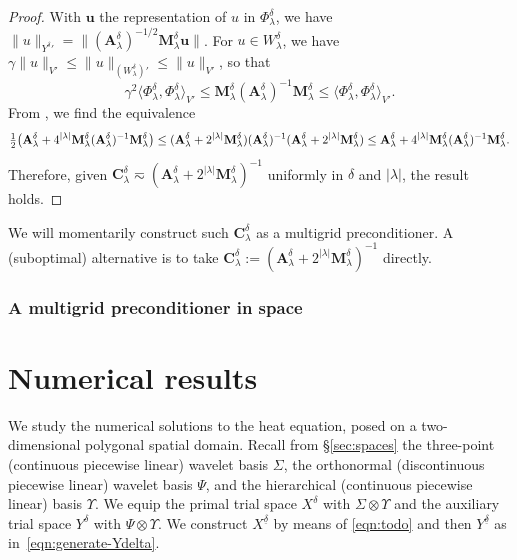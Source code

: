 \documentclass[11pt,a4paper,oneside,english]{amsart}
\numberwithin{equation}{section}
\numberwithin{theorem}{section}
\theoremstyle{definition}
\newcommand{\la}{\langle}
\newcommand{\ra}{\rangle}
\newcommand{\udelta}{{\underline{\delta}}}
\newcommand{\jw}[1]{{\color{red}{JW: #1}}}
\begin{document}
\begin{proof}

  With $\mathbf u$ the representation of $u$ in $\Phi_\lambda^\delta$, we have
  $\|u\|_{{Y^\delta}'} = \|(\mathbf A_\lambda^\delta)^{-1/2} \mathbf M_\lambda^\delta \mathbf u\|$.
For $u \in W_\lambda^\delta$, we have $\gamma \|u\|_{V'} \leq \|u\|_{(W_\lambda^\delta)'} \leq \|u\|_{V'}$, so that
  \[
    \gamma^2 \la \Phi_\lambda^\delta, \Phi_\lambda^\delta \ra_{V'} \leq \mathbf M_\lambda^\delta (\mathbf A_\lambda^\delta)^{-1} \mathbf M_\lambda^\delta \leq \la \Phi_\lambda^\delta, \Phi_\lambda^\delta \ra_{V'}.
  \]
  From \cite[Thm.~4]{Pearson2012}, we find the equivalence
  \[
\tfrac12\big( {\bf A}_\lambda^\delta + 4^{|\lambda|} {\bf M}^\delta_\lambda ({\bf A}^\delta_\lambda)^{-1}  {\bf M}^\delta_\lambda\big)
\leq ({\bf A}_\lambda^\delta + 2^{|\lambda|}{\bf M}^\delta_\lambda) ({\bf A}_\lambda^\delta)^{-1} ({\bf A}_\lambda^\delta + 2^{|\lambda|}{\bf M}^\delta_\lambda)
\leq {\bf A}_\lambda^\delta + 4^{|\lambda|} {\bf M}^\delta_\lambda ({\bf A}^\delta_\lambda)^{-1}  {\bf M}^\delta_\lambda.
\]
Therefore, given $\mathbf C_\lambda^\delta \eqsim (\mathbf A_\lambda^\delta + 2^{|\lambda|} \mathbf M_\lambda^\delta)^{-1}$ uniformly in $\delta$ and $|\lambda|$, the result holds.
\end{proof}
We will momentarily construct such $\mathbf C_\lambda^\delta$ as a multigrid
preconditioner. A (suboptimal) alternative is to take
$\mathbf C_\lambda^\delta := (\mathbf A_\lambda^\delta + 2^{|\lambda|} \mathbf M_\lambda^\delta)^{-1}$
directly.

\subsubsection{A multigrid preconditioner in space}
\label{sec:mgprecond}
\jw{ray: kan jij hier iets over schrijven?}



\section{Numerical results}
We study the numerical solutions to the heat equation, posed on a two-dimensional
polygonal spatial domain. Recall from \S\ref{sec:spaces} the three-point (continuous piecewise linear) 
wavelet basis $\Sigma$, the orthonormal (discontinuous piecewise linear)
wavelet basis $\Psi$, and the hierarchical (continuous piecewise linear) basis $\Upsilon$.
We equip the primal trial space $X^\delta$ with $\Sigma \otimes \Upsilon$ and
the auxiliary trial space $Y^\delta$ with $\Psi \otimes \Upsilon$. We construct
$X^\udelta$ by means of \eqref{eqn:todo} and then $Y^\udelta$ as in~\eqref{eqn:generate-Ydelta}.
\end{document}
